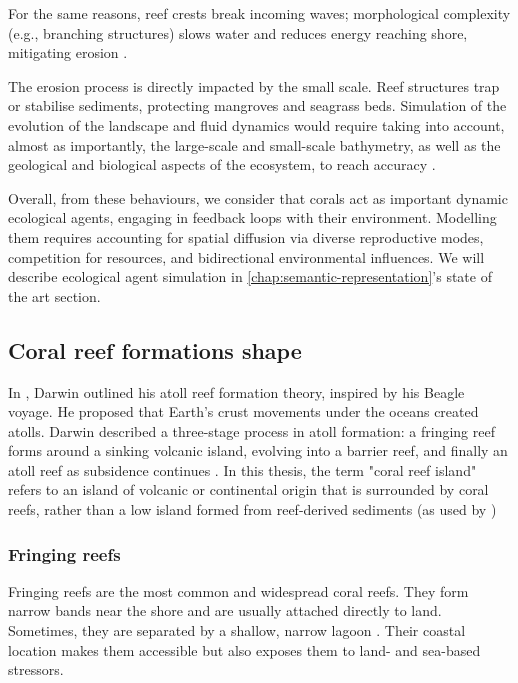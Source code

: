 For the same reasons, reef crests break incoming waves; morphological complexity (e.g., branching structures) slows water and reduces energy reaching shore, mitigating erosion \cite{Woodroffe2003}.

The erosion process is directly impacted by the small scale. Reef structures trap or stabilise sediments, protecting mangroves and seagrass beds. Simulation of the evolution of the landscape and fluid dynamics would require taking into account, almost as importantly, the large-scale and small-scale bathymetry, as well as the geological and biological aspects of the ecosystem, to reach accuracy \cite{Chevalier2017,Chevalier2015a}.

Overall, from these behaviours, we consider that corals act as important dynamic ecological agents, engaging in feedback loops with their environment. Modelling them requires accounting for spatial diffusion via diverse reproductive modes, competition for resources, and bidirectional environmental influences. We will describe ecological agent simulation in \cref{chap:semantic-representation}'s state of the art section.


\subsection{Coral reef formations shape}
In \cite{Darwin1842}, Darwin outlined his atoll reef formation theory, inspired by his Beagle voyage. He proposed that Earth's crust movements under the oceans created atolls. Darwin described a three-stage process in atoll formation: a fringing reef forms around a sinking volcanic island, evolving into a barrier reef, and finally an atoll reef as subsidence continues \cite{Hopley2014}. In this thesis, the term "coral reef island" refers to an island of volcanic or continental origin that is surrounded by coral reefs, rather than a low island formed from reef-derived sediments (as used by \cite{Masselink2020})

\subsubsection{Fringing reefs}
Fringing reefs are the most common and widespread coral reefs. They form narrow bands near the shore and are usually attached directly to land. Sometimes, they are separated by a shallow, narrow lagoon \cite{Kovacs2020}. Their coastal location makes them accessible but also exposes them to land- and sea-based stressors.

